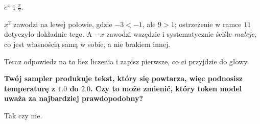 \begin{fr}
\begin{ansblock}
$e^{x}$ i $\frac{x}{2}$.
\end{ansblock}

$x^{2}$ zawodzi na lewej połowie, gdzie $-3 < -1$, ale $9 > 1$; ostrzeżenie w
ramce $11$ dotyczyło dokładnie tego. A $-x$ zawodzi wszędzie i systematycznie
\dash{} ściśle \emph{maleje}, co jest własnością samą w sobie, a nie brakiem
innej.

Teraz odpowiedz na to bez liczenia i zapisz pierwsze, co ci przyjdzie do
głowy.

\textbf{Twój sampler produkuje tekst, który się powtarza, więc podnosisz
temperaturę z $\num{1.0}$ do $\num{2.0}$. Czy to może zmienić, który token
model uważa za najbardziej prawdopodobny?}

Tak czy nie.
\dotline
\nextframe
\end{fr}

